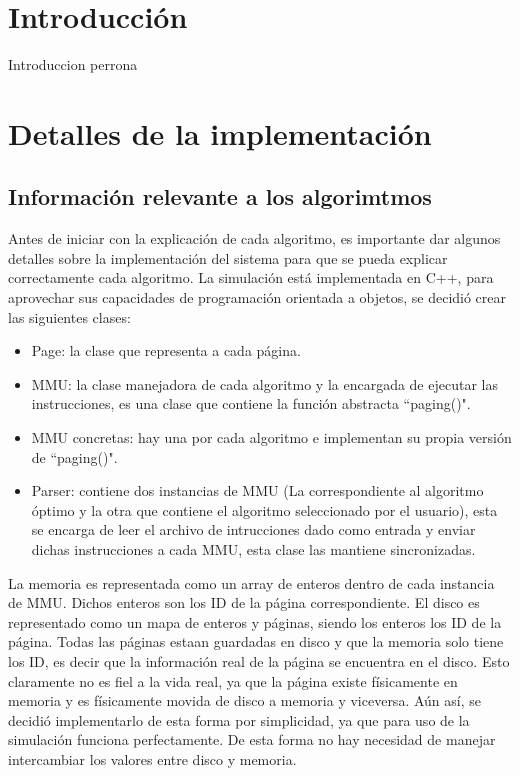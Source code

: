 \documentclass{report}
\begin{document}


\tableofcontents

\chapter{Introducción}\label{intro}
Introduccion perrona

\chapter{Detalles de la implementación}
\section {Información relevante a los algorimtmos}
Antes de iniciar con la explicación de cada algoritmo, es importante dar algunos detalles sobre la implementación del sistema para que se pueda explicar correctamente cada algoritmo. 
La simulación está implementada en C++, para aprovechar sus capacidades de programación orientada a objetos, se decidió crear las siguientes clases:

\begin{itemize}
    \item Page: la clase que representa a cada página.
    \item MMU: la clase manejadora de cada algoritmo y la encargada de ejecutar las instrucciones, es una clase que contiene la función  abstracta ``paging()".
    \item MMU concretas: hay una por cada algoritmo e implementan su propia versión de ``paging()".
    \item Parser: contiene dos instancias de MMU (La correspondiente al algoritmo óptimo y la otra que contiene el algoritmo seleccionado por el usuario), esta se encarga de leer el archivo de intrucciones dado como entrada y enviar dichas instrucciones a cada MMU, esta clase las mantiene sincronizadas. 
\end{itemize}

La memoria es representada como un array de enteros dentro de cada instancia de MMU. 
Dichos enteros son los ID de la página correspondiente. 
El disco es representado como un mapa de enteros y páginas, siendo los enteros los ID de la página.
Todas las páginas estaan guardadas en disco y que la memoria solo tiene los ID, es decir que la información real de la página se encuentra en el disco.
Esto claramente no es fiel a la vida real, ya que la página existe físicamente en memoria y es físicamente movida de disco a memoria y viceversa.
Aún así, se decidió implementarlo de esta forma por simplicidad, ya que para uso de la simulación funciona perfectamente.
De esta forma no hay necesidad de manejar intercambiar los valores entre disco y memoria.
\end{document}
